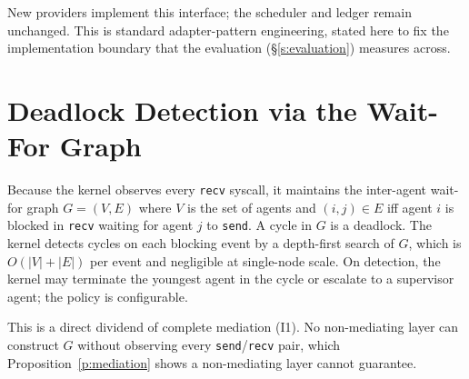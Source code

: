\documentclass[letterpaper,11pt,leqno]{article}
\begin{document}
New providers implement this interface; the scheduler and ledger remain unchanged. This is standard adapter-pattern engineering, stated here to fix the implementation boundary that the evaluation (\S\ref{s:evaluation}) measures across.

\section{Deadlock Detection via the Wait-For Graph}\label{a:deadlock}

Because the kernel observes every \texttt{recv} syscall, it maintains the inter-agent wait-for graph $G = (V, E)$ where $V$ is the set of agents and $(i, j) \in E$ iff agent $i$ is blocked in \texttt{recv} waiting for agent $j$ to \texttt{send}. A cycle in $G$ is a deadlock. The kernel detects cycles on each blocking event by a depth-first search of $G$, which is $O(|V| + |E|)$ per event and negligible at single-node scale. On detection, the kernel may terminate the youngest agent in the cycle or escalate to a supervisor agent; the policy is configurable.

This is a direct dividend of complete mediation (I1). No non-mediating layer can construct $G$ without observing every \texttt{send}/\texttt{recv} pair, which Proposition~\ref{p:mediation} shows a non-mediating layer cannot guarantee.
\end{document}
